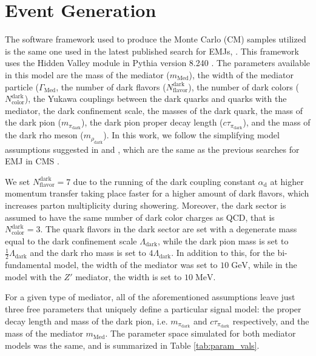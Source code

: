 \chapter{Event Generation}
\label{chap:eventgen}

The software framework used to produce the Monte Carlo (CM) samples utilized is the same one used in the latest published search for EMJs, \cite{cmscollaborationSearchNewPhysics2024}. This framework uses the Hidden Valley module \cite{carloniVisibleEffectsInvisible2010, carloniDiscerningSecludedSector2011} in Pythia version 8.240 \cite{sjostrandIntroductionPYTHIA822015}. The parameters available in this model are the mass of the mediator ($m_{\text{Med}}$), the width of the mediator particle ($\Gamma_{\text{Med}}$, the number of dark flavors ($N_{\text{flavor}}^\text{dark}$), the number of dark colors ($N_{\text{color}}^\text{dark}$), the Yukawa couplings between the dark quarks and quarks with the mediator, the dark confinement scale, the masses of the dark quark, the mass of the dark pion ($m_{\pi_{\text{dark}}}$), the dark pion proper decay length ($c\tau_{\pi_{\text{dark}}}$), and the mass of the dark rho meson ($m_{\rho_{\text{dark}}}$). In this work, we follow the simplifying model assumptions suggested in \cite{baiScaleDarkQCD2014} and \cite{schwallerEmergingJets2015}, which are the same as the previous searches for EMJ in CMS \cite{cmscollaborationSearchNewParticles2019, cmscollaborationSearchNewPhysics2024}. 

We set $N_{\text{flavor}}^{\text{dark}} = 7$ due to the running of the dark coupling constant $\alpha_{\text{d}}$ at higher momentum transfer taking place faster for a higher amount of dark flavors, which increases parton multiplicity during showering. Moreover, the dark sector is assumed to have the same number of dark color charges as QCD, that is $N_{\text{color}}^{\text{dark}} = 3$. The quark flavors in the dark sector are set with a degenerate mass equal to the dark confinement scale $\Lambda_{\text{dark}}$, while the dark pion mass is set to $\frac12 \Lambda_{\text{dark}}$ and the dark rho mass is set to $4\Lambda_{\text{dark}}$. In addition to this, for the bi-fundamental model, the width of the mediator was set to $10\;\text{GeV}$, while in the model with the $Z'$ mediator, the width is set to $10\;\text{MeV}$.

For a given type of mediator, all of the aforementioned assumptions leave just three free parameters that uniquely define a particular signal model: the proper decay length and mass of the dark pion, i.e. $m_{\pi_{\text{dark}}}$ and $c\tau_{\pi_{\text{dark}}}$ respectively, and the mass of the mediator $m_{\text{Med}}$. The parameter space simulated for both mediator models was the same, and is summarized in Table \ref{tab:param_vals}.

